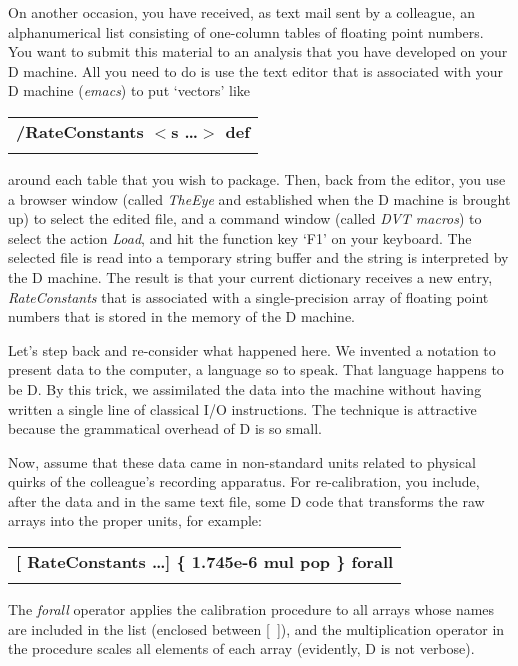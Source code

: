On another occasion, you have received, as text mail sent by a colleague, an alphanumerical list consisting of one-column tables of floating  point numbers.  You  want to submit this material to an analysis that you  have developed on your D machine.  All you need to do is use the text editor that is associated with your D machine (\emph{emacs}) to put `vectors' like\\

\begin{tabular}{>{\sffamily\bfseries}l}
 /RateConstants $<$s \ldots $>$ def\\\\
\end{tabular}

\noindent around each table that you wish to package.  Then,  back from the editor, you use a browser window (called \emph{TheEye} and established when the D machine is brought up) to select the edited file, and a command window (called \emph{DVT macros}) to select the action \emph{Load}, and hit the function key `F1' on your keyboard. The selected file is read into a temporary string buffer and the string is interpreted by the D machine. The result is that your current dictionary receives a new entry, \emph{RateConstants} that is associated with a single-precision array of floating point numbers that is stored in the memory of the D machine.  

Let's  step  back  and re-consider what happened  here.  We  invented  a notation to present data to the computer,  a language so to  speak.  That language happens to be D. By this trick, we assimilated the data into the machine   without  having  written  a  single  line  of   classical   I/O instructions.   The  technique  is  attractive  because  the  grammatical overhead of D is so small. 

Now,  assume  that  these  data came in non-standard  units  related  to physical  quirks  of  the  colleague's  recording  apparatus.   For   re-calibration,  you include, after the data and in the same text file, some D  code  that  transforms  the raw arrays  into  the  proper  units,  for example:\\

\begin{tabular}{>{\sffamily\bfseries}l}
 [ RateConstants \ldots ] \{ 1.745e-6 mul pop \} forall\\\\
\end{tabular}

\noindent The  \emph{forall} operator applies the calibration procedure to  all  arrays whose  names  are included in the list (enclosed  between  [\ ]),  and  the multiplication  operator  in the procedure scales all  elements  of  each array (evidently, D is not verbose).

